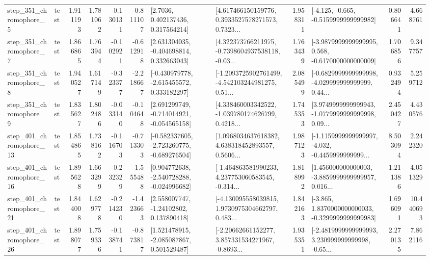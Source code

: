 \begin{tabular}{llrrrrllrlrr}
   step\_351\_chromophore\_5 &      test &      1.911193 &    1.781062 &     -0.130131 & -0.811107 &          [2.7036, 0.402137436, 0.317564214] &  [4.617466150159776, 0.3933527578271573, 0.7323... &       1.958311 &              [-4.125, -0.665, -0.5159999999999982] &            0.806641 &          4.668761 \\
   step\_351\_chromophore\_7 &      test &      1.866865 &    1.763944 &     -0.102921 & -0.612918 &    [2.631304035, -0.404698814, 0.332663043] &  [4.322373766211975, -0.7398604937538118, -0.03... &       1.763439 &  [-3.9879999999999995, 0.568, -0.6170000000000009] &            1.706856 &          9.347757 \\
   step\_351\_chromophore\_8 &      test &      1.940527 &    1.617149 &     -0.323377 & -2.218667 &   [-0.430979778, -2.615455572, 0.333182297] &  [-1.2093725902761499, -4.542103244981275, 0.51... &       2.085499 &  [-0.6829999999999998, -4.029999999999999, 0.44... &            0.932494 &          5.259712 \\
   step\_351\_chromophore\_9 &      test &      1.835627 &    1.802486 &     -0.033140 & -0.104648 &   [2.691299749, -0.714014921, -0.054565158] &  [4.338460003342522, -1.039780174626799, 0.4218... &       1.745353 &  [3.9749999999999943, -1.0779999999999998, 0.09... &            2.450427 &          4.430576 \\
  step\_401\_chromophore\_13 &      test &      1.854865 &    1.738162 &     -0.116703 & -0.713303 &  [-0.582337605, -2.723260775, -0.689276504] &  [1.0968034637618382, 4.638318452893557, 0.5606... &       1.987123 &  [-1.1159999999999997, -4.032, -0.4459999999999... &            8.503094 &          2.242320 \\
  step\_401\_chromophore\_16 &      test &      1.895628 &    1.663299 &     -0.232329 & -1.555488 &   [0.904772638, -2.540728288, -0.024996682] &  [-1.464863581990233, 4.237753060583545, -0.314... &       1.818992 &  [1.456000000000003, -3.8859999999999957, 0.016... &            1.211386 &          4.051329 \\
  step\_401\_chromophore\_21 &      test &      1.844008 &    1.629778 &     -0.214230 & -1.423663 &     [2.558007747, -1.24102802, 0.137890418] &  [-4.130095558039815, 1.9730975304662797, 0.483... &       1.842163 &  [-3.865, 1.8370000000000033, -0.3299999999999983] &            1.696091 &         10.440693 \\
  step\_401\_chromophore\_26 &      test &      1.898077 &    1.759336 &     -0.138741 & -0.873817 &    [1.521478915, -2.085087867, 0.501529487] &  [-2.20662661152277, 3.857331534271967, -0.8693... &       1.935351 &  [-2.4819999999999993, 3.230999999999998, -0.65... &            2.270135 &          7.862116 \\

\end{tabular}

